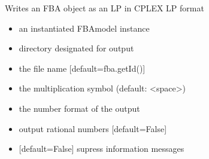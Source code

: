 \documentclass[letterpaper,10pt,english]{sphinxmanual}
\begin{document}
\begin{fulllineitems}
\label{\detokenize{modules_doc:cbmpy.CBWrite.writeModelLP}}
\pysigstartsignatures
{}
\pysigstopsignatures
\sphinxAtStartPar
Writes an FBA object as an LP in CPLEX LP format
\begin{itemize}
\item {} 
\sphinxAtStartPar
{} an instantiated FBAmodel instance

\item {} 
\sphinxAtStartPar
{} directory designated for output

\item {} 
\sphinxAtStartPar
{} the file name {[}default=fba.getId(){]}

\item {} 
\sphinxAtStartPar
{} the multiplication symbol (default: \textless{}space\textgreater{})

\item {} 
\sphinxAtStartPar
{} the number format of the output

\item {} 
\sphinxAtStartPar
{} output rational numbers {[}default=False{]}

\item {} 
\sphinxAtStartPar
{} {[}default=False{]} supress information messages

\end{itemize}

\end{fulllineitems}
\end{document}

